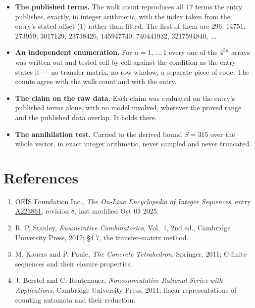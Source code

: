 \documentclass[11pt]{article}
\theoremstyle{definition}
\begin{document}
\begin{itemize}

\item {\bfseries The published terms.} The walk count reproduces all 17 terms the entry publishes, exactly, in integer arithmetic, with the index taken from the entry's stated offset (1) rather than fitted. The first of them are 296, 14751, 273959, 3017129, 23738426, 145947740, 740441932, 3217594840,~\dots

\item {\bfseries An independent enumeration.} For $n = 1,\dots,1$ every one of the $4^{5n}$ arrays was written out and tested cell by cell against the condition as the entry states it --- no transfer matrix, no row window, a separate piece of code. The counts agree with the walk count and with the entry.

\item {\bfseries The claim on the raw data.} Each claim was evaluated on the entry's published terms alone, with no model involved, wherever the proved range and the published data overlap. It holds there.

\item {\bfseries The annihilation test.} Carried to the derived bound $S = 315$ over the whole vector, in exact integer arithmetic, never sampled and never truncated.

\end{itemize}

\section{References}

\begin{enumerate}

\item OEIS Foundation Inc., \emph{The On-Line Encyclopedia of Integer Sequences}, entry \href{https://oeis.org/A223861}{A223861}, revision 8, last modified Oct 03 2025.

\item R. P. Stanley, \emph{Enumerative Combinatorics}, Vol.~1, 2nd ed., Cambridge University Press, 2012; \S4.7, the transfer-matrix method.

\item M. Kauers and P. Paule, \emph{The Concrete Tetrahedron}, Springer, 2011; C-finite sequences and their closure properties.

\item J. Berstel and C. Reutenauer, \emph{Noncommutative Rational Series with Applications}, Cambridge University Press, 2011; linear representations of counting automata and their reduction.

\end{enumerate}
\end{document}

